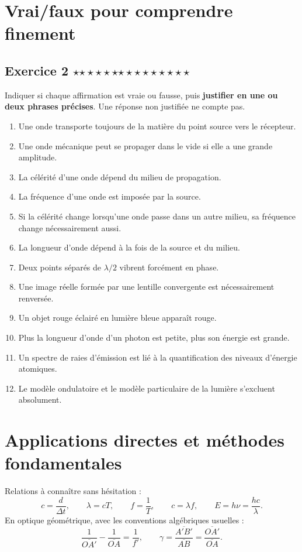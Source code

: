 \documentclass[11pt,a4paper]{article}
\newcommand{\etoiles}[1]{%
\ifcase#1\or $\star$\or $\star\star$\or $\star\star\star$\or $\star\star\star\star$\or $\star\star\star\star\star$\fi}
\newcommand{\exostar}[2]{\subsection*{Exercice #1 \hfill \etoiles{#2}}}
\begin{document}
\section{Vrai/faux pour comprendre finement}

\exostar{2}{2}
Indiquer si chaque affirmation est vraie ou fausse, puis \textbf{justifier en une ou deux phrases précises}. Une réponse non justifiée ne compte pas.

\begin{enumerate}[label=\textbf{Affirmation \arabic*.},leftmargin=1.8cm]
    \item Une onde transporte toujours de la matière du point source vers le récepteur.
    \item Une onde mécanique peut se propager dans le vide si elle a une grande amplitude.
    \item La célérité d'une onde dépend du milieu de propagation.
    \item La fréquence d'une onde est imposée par la source.
    \item Si la célérité change lorsqu'une onde passe dans un autre milieu, sa fréquence change nécessairement aussi.
    \item La longueur d'onde dépend à la fois de la source et du milieu.
    \item Deux points séparés de $\lambda/2$ vibrent forcément en phase.
    \item Une image réelle formée par une lentille convergente est nécessairement renversée.
    \item Un objet rouge éclairé en lumière bleue apparaît rouge.
    \item Plus la longueur d'onde d'un photon est petite, plus son énergie est grande.
    \item Un spectre de raies d'émission est lié à la quantification des niveaux d'énergie atomiques.
    \item Le modèle ondulatoire et le modèle particulaire de la lumière s'excluent absolument.
\end{enumerate}

\section{Applications directes et méthodes fondamentales}

\begin{rappelbox}
Relations à connaître sans hésitation :
\[
 c = \frac{d}{\Delta t},\qquad \lambda = cT,\qquad f=\frac{1}{T},\qquad c=\lambda f,\qquad E=h\nu = \frac{hc}{\lambda}.
\]
En optique géométrique, avec les conventions algébriques usuelles :
\[
\frac{1}{\overline{OA'}}-\frac{1}{\overline{OA}}=\frac{1}{f'},
\qquad \gamma = \frac{\overline{A'B'}}{\overline{AB}} = \frac{\overline{OA'}}{\overline{OA}}.
\]
\end{rappelbox}
\end{document}
